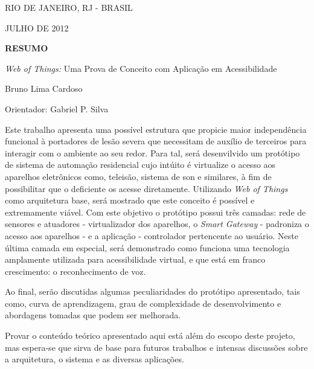 \begin{titlepage}
\begin{center}

RIO DE JANEIRO, RJ - BRASIL

JULHO DE 2012

\end{center}

\bigskip

\clearpage
\bigskip

\begin{center}
\centerline{\textbf{\large RESUMO}}


\bigskip

\emph{Web of Things:} Uma Prova de Conceito com Aplicação em Acessibilidade


\bigskip

Bruno Lima Cardoso


\end{center}
\bigskip


\bigskip


Orientador: Gabriel P. Silva 


\bigskip


\bigskip

Este trabalho apresenta uma possível estrutura que propicie maior independência funcional à portadores de lesão severa que necessitam de auxílio de terceiros para interagir com o ambiente ao seu redor. Para tal, será desenvilvido um protótipo de sistema de automação residencial cujo intúito é virtualize o acesso aos aparelhos eletrônicos como, teleisão, sistema de son e similares, à fim de possibilitar que o deficiente os acesse diretamente. Utilizando \emph{Web of Things} como arquitetura base, será mostrado que este conceito é possível e extremamente viável. Com este objetivo o protótipo possui três camadas: rede de sensores e atuadores - virtualizador dos aparelhos, o \emph{Smart Gateway} - padroniza o acesso aos aparelhos - e a aplicação - controlador pertencente ao usuário. Neste última camada em especial, será demonstrado como funciona uma tecnologia amplamente utilizada para acessibilidade virtual, e que está em franco crescimento: o reconhecimento de voz.

Ao final, serão discutidas algumas peculiaridades do protótipo apresentado, tais como, curva de aprendizagem, grau de complexidade de desenvolvimento e abordagens tomadas que podem ser melhorada.

Provar o conteúdo teórico apresentado aqui está além do escopo deste projeto, mas espera-se que sirva de base para futuros trabalhos e intensas discussões sobre a arquitetura, o sistema e as diversas aplicações.


\end{titlepage}
